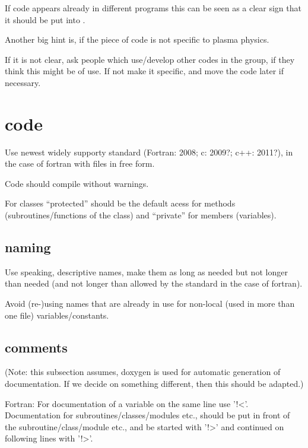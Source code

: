 \documentclass{article}
\begin{document}
If code appears already in different programs this can be seen as a
clear sign that it should be put into \libneo.

Another big hint is, if the piece of code is not specific to plasma
physics.

If it is not clear, ask people which use/develop other codes in the
group, if they think this might be of use.
If not make it specific, and move the code later if necessary.

\section{code}

Use newest widely supporty standard (Fortran: 2008; c: 2009?; c++: 2011?), in
the case of fortran with files in free form.

Code should compile without warnings.

For classes ``protected'' should be the default acess for methods
(subroutines/functions of the class) and ``private'' for members
(variables).

\subsection{naming}
Use speaking, descriptive names, make them as long as needed but not
longer than needed (and not longer than allowed by the standard in the
case of fortran).

Avoid (re-)using names that are already in use for non-local (used in
more than one file) variables/constants.

\subsection{comments}
(Note: this subsection assumes, doxygen is used for automatic generation
of documentation. If we decide on something different, then this should
be adapted.)

Fortran: For documentation of a variable on the same line use '!<'.
Documentation for subroutines/classes/modules etc., should be put in
front of the subroutine/class/module etc., and be started with '!>' and
continued on following lines with '!>'.
\end{document}
